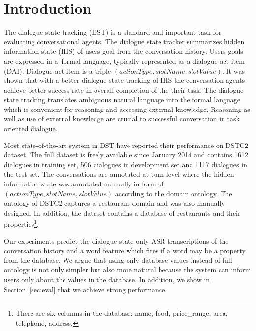 \documentclass{itatnew}
\begin{document}
\section{Introduction}
%
The dialogue state tracking (DST) is a standard and important task for evaluating conversational agents\cite{williams2013dialog, henderson2014second, henderson2014third}.
The dialogue state tracker summarizes hidden information state (HIS)\cite{young2010hidden} of users goal from the conversation history.
Users goals are expressed in a~formal language, typically represented as a dialogue act item (DAI). Dialogue act item is a triple $(actionType, slotName, slotValue)$.
It was shown that with a better dialogue state tracking of HIS the conversation agents achieve better success rate in overall completion of the their task\cite{jurvcivcek2012reinforcement}.
The dialogue state tracking translates ambiguous natural language into the formal language which is convenient for reasoning and accessing external knowledge. Reasoning as well as use of external knowledge are crucial to successful conversation in task oriented dialogue.

Most state-of-the-art system in DST have reported their performance on DSTC2 dataset\cite{henderson2014second}. 
The full dataset is freely available since January 2014 and contains 1612 dialogues in training set, 506 dialogues in development set and 1117 dialogues in the test set.
The conversations are annotated at turn level where the hidden information state was annotated manually in form of $(actionType, slotName, slotValue)$ according to the domain ontology.
The ontology of DSTC2 captures a~restaurant domain and was also manually designed.
In addition, the dataset contains a database of restaurants and their properties\footnote{There are six columns in the database: name, food, price\_range, area, telephone, address.}.

Our experiments predict the dialogue state only ASR transcriptions of the conversation history and a word feature which fires if a word may be a property from the database.
We argue that using only database values instead of full ontology is not only simpler but also more natural because the system can inform users only about the values in the database.
In addition, we show in Section~\ref{sec:eval} that we achieve strong performance.
\end{document}
